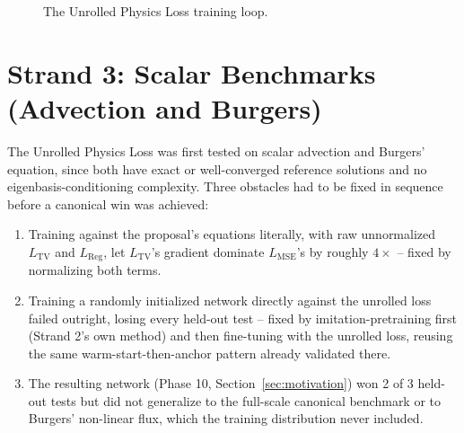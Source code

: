 \documentclass[11pt]{article}
\begin{document}
\begin{figure}[htbp]
\centering
{}
\caption{The Unrolled Physics Loss training loop.}
\end{figure}

\section{Strand 3: Scalar Benchmarks (Advection and Burgers)}
\label{sec:strand3}

The Unrolled Physics Loss was first tested on scalar advection and
Burgers' equation, since both have exact or well-converged reference
solutions and no eigenbasis-conditioning complexity. Three obstacles had
to be fixed in sequence before a canonical win was achieved:

\begin{enumerate}
    \item Training against the proposal's equations literally, with raw
    unnormalized $L_{\text{TV}}$ and $L_{\text{Reg}}$, let
    $L_{\text{TV}}$'s gradient dominate $L_{\text{MSE}}$'s by roughly
    $4\times$ -- fixed by normalizing both terms.
    \item Training a randomly initialized network directly against the
    unrolled loss failed outright, losing every held-out test -- fixed by
    imitation-pretraining first (Strand 2's own method) and then
    fine-tuning with the unrolled loss, reusing the same
    warm-start-then-anchor pattern already validated there.
    \item The resulting network (Phase 10, Section~\ref{sec:motivation})
    won 2 of 3 held-out tests but did not generalize to the full-scale
    canonical benchmark or to Burgers' non-linear flux, which the training
    distribution never included.
\end{enumerate}
\end{document}
